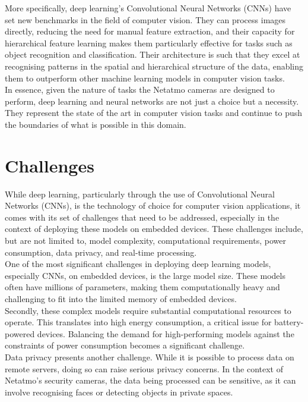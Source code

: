 More specifically, deep learning's Convolutional Neural Networks (CNNs) have set
new benchmarks in the field of computer vision. They can process images
directly, reducing the need for manual feature extraction, and their capacity
for hierarchical feature learning makes them particularly effective for tasks
such as object recognition and classification. Their architecture is such that
they excel at recognising patterns in the spatial and hierarchical structure of
the data, enabling them to outperform other machine learning models in computer
vision tasks.\\

In essence, given the nature of tasks the Netatmo cameras are designed to
perform, deep learning and neural networks are not just a choice but a
necessity. They represent the state of the art in computer vision tasks and
continue to push the boundaries of what is possible in this domain.\\

\section{Challenges}

While deep learning, particularly through the use of Convolutional Neural
Networks (CNNs), is the technology of choice for computer vision applications,
it comes with its set of challenges that need to be addressed, especially in the
context of deploying these models on embedded devices. These challenges include,
but are not limited to, model complexity, computational requirements, power
consumption, data privacy, and real-time processing.\\

One of the most significant challenges in deploying deep learning models,
especially CNNs, on embedded devices, is the large model size. These models
often have millions of parameters, making them computationally heavy and
challenging to fit into the limited memory of embedded devices.\\

Secondly, these complex models require substantial computational resources to
operate. This translates into high energy consumption, a critical issue for
battery-powered devices. Balancing the demand for high-performing models against
the constraints of power consumption becomes a significant challenge.\\

Data privacy presents another challenge. While it is possible to process data on
remote servers, doing so can raise serious privacy concerns. In the context of
Netatmo's security cameras, the data being processed can be sensitive, as it can
involve recognising faces or detecting objects in private spaces.\\

